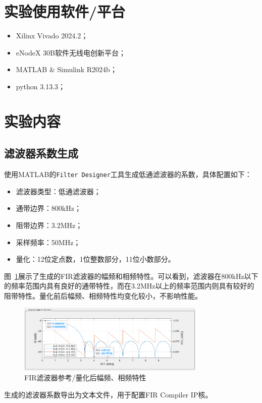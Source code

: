 \section{实验使用软件/平台}
\begin{itemize}
    \item Xilinx Vivado 2024.2；
    \item eNodeX 30B软件无线电创新平台；
    \item MATLAB \& Simulink R2024b；
    \item python 3.13.3；
  \end{itemize}
\section{实验内容}
\subsection{滤波器系数生成}
使用MATLAB的\texttt{Filter Designer}工具生成低通滤波器的系数，具体配置如下：
\begin{itemize}
    \item 滤波器类型：低通滤波器；
    \item 通带边界：800kHz；
    \item 阻带边界：3.2MHz；
    \item 采样频率：50MHz；
    \item 量化：12位定点数，1位整数部分，11位小数部分。
\end{itemize}

图~\ref{fig:filter_coefficients}展示了生成的FIR滤波器的幅频和相频特性。可以看到，滤波器在800kHz以下的频率范围内具有良好的通带特性，而在3.2MHz以上的频率范围内则具有较好的阻带特性。量化前后幅频、相频特性均变化较小，不影响性能。
\begin{figure}[htbp]
    \centering
    \includegraphics[width=0.8\textwidth]{figure/exp7/filterDesign.png}
    \caption{FIR滤波器参考/量化后幅频、相频特性}
    \label{fig:filter_coefficients}
\end{figure}

生成的滤波器系数导出为文本文件，用于配置FIR Compiler IP核。

